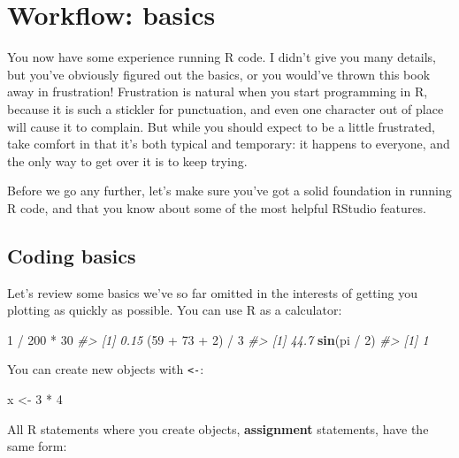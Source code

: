 \documentclass[]{book}
\newenvironment{Shaded}{\begin{snugshade}}{\end{snugshade}}
\newcommand{\KeywordTok}[1]{\textcolor[rgb]{0.13,0.29,0.53}{\textbf{{#1}}}}
\newcommand{\DecValTok}[1]{\textcolor[rgb]{0.00,0.00,0.81}{{#1}}}
\newcommand{\StringTok}[1]{\textcolor[rgb]{0.31,0.60,0.02}{{#1}}}
\newcommand{\CommentTok}[1]{\textcolor[rgb]{0.56,0.35,0.01}{\textit{{#1}}}}
\newcommand{\NormalTok}[1]{{#1}}
\begin{document}
\hypertarget{workflow-basics}{\chapter{Workflow:
basics}\label{workflow-basics}}

You now have some experience running R code. I didn't give you many
details, but you've obviously figured out the basics, or you would've
thrown this book away in frustration! Frustration is natural when you
start programming in R, because it is such a stickler for punctuation,
and even one character out of place will cause it to complain. But while
you should expect to be a little frustrated, take comfort in that it's
both typical and temporary: it happens to everyone, and the only way to
get over it is to keep trying.

Before we go any further, let's make sure you've got a solid foundation
in running R code, and that you know about some of the most helpful
RStudio features.

\section{Coding basics}\label{coding-basics}

Let's review some basics we've so far omitted in the interests of
getting you plotting as quickly as possible. You can use R as a
calculator:

\begin{Shaded}
\begin{Highlighting}[]
\DecValTok{1} \NormalTok{/}\StringTok{ }\DecValTok{200} \NormalTok{*}\StringTok{ }\DecValTok{30}
\CommentTok{#> [1] 0.15}
\NormalTok{(}\DecValTok{59} \NormalTok{+}\StringTok{ }\DecValTok{73} \NormalTok{+}\StringTok{ }\DecValTok{2}\NormalTok{) /}\StringTok{ }\DecValTok{3}
\CommentTok{#> [1] 44.7}
\KeywordTok{sin}\NormalTok{(pi /}\StringTok{ }\DecValTok{2}\NormalTok{)}
\CommentTok{#> [1] 1}
\end{Highlighting}
\end{Shaded}

You can create new objects with \texttt{\textless{}-}:

\begin{Shaded}
\begin{Highlighting}[]
\NormalTok{x <-}\StringTok{ }\DecValTok{3} \NormalTok{*}\StringTok{ }\DecValTok{4}
\end{Highlighting}
\end{Shaded}

All R statements where you create objects, \textbf{assignment}
statements, have the same form:
\end{document}
